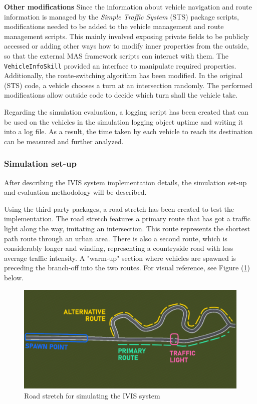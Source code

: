 \documentclass[main.tex]{subfiles}
\begin{document}
\textbf{Other modifications} \smallskip \newline
Since the information about vehicle navigation and route information is managed by the
\emph{Simple Traffic System} (STS) package scripts, modifications needed to be added to the
vehicle management and route management scripts. This mainly involved exposing private fields
to be publicly accessed or adding other ways how to modify inner properties from the outside,
so that the external MAS framework scripts can interact with them. The
\texttt{VehicleInfoSkill} provided an interface to manipulate required properties.
Additionally, the route-switching algorithm has been modified. In the original (STS) code,
a vehicle chooses a turn at an intersection randomly. The performed modifications allow outside 
code to decide which turn shall the vehicle take.

Regarding the simulation evaluation, a logging script has been created that can be used on the 
vehicles in the simulation logging object uptime and writing it into a log file. As a result, 
the time taken by each vehicle to reach its destination can be measured and further analyzed.

\subsubsection{Simulation set-up}

After describing the IVIS system implementation details, the simulation set-up and evaluation 
methodology will be described. 

Using the third-party packages, a road stretch has been created to test the implementation.
The road stretch features a primary route that has got a traffic light along the way, imitating 
an intersection. This route represents the shortest path route through an urban area. 
There is also a second route, which is considerably longer and winding, representing a countryside 
road with less average traffic intensity. A "warm-up" section where vehicles are spawned is
preceding the branch-off into the two routes. For visual reference, see Figure
(\ref{fig-routeMap}) below.

\begin{figure}[htbp]
    \centering
    \includegraphics[width=.9\textwidth]{test-route-map-legend.png}
    \caption{Road stretch for simulating the IVIS system}
    \label{fig-routeMap}
\end{figure}
\end{document}
